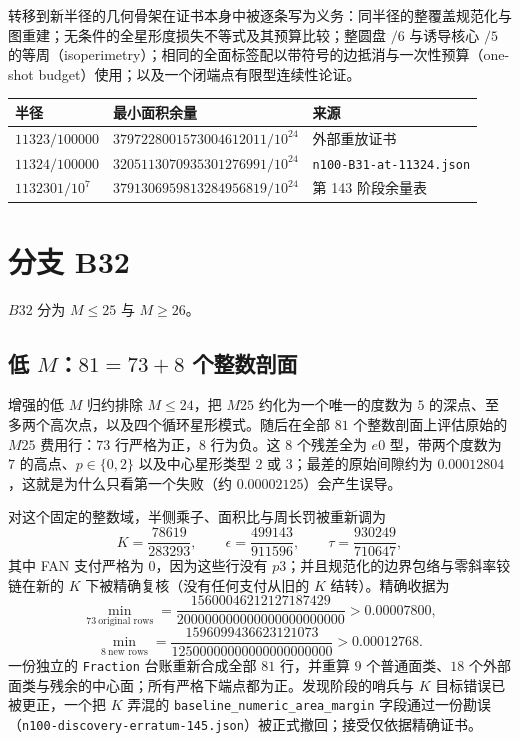 转移到新半径的几何骨架在证书本身中被逐条写为义务：同半径的整覆盖规范化与图重建；无条件的全星形度损失不等式及其预算比较；整圆盘 $/6$ 与诱导核心 $/5$ 的等周（isoperimetry）；相同的全面标签配以带符号的边抵消与一次性预算（one-shot budget）使用；以及一个闭端点有限型连续性论证。

\begin{center}
\footnotesize
\begin{tabular}{@{}>{\raggedright\arraybackslash}p{}>{\raggedright\arraybackslash}p{}>{\raggedright\arraybackslash}p{}@{}}
\toprule
半径 & 最小面积余量 & 来源 \\
\midrule
$11323/100000$ & $3797228001573004612011/10^{24}$ & 外部重放证书 \\
$11324/100000$ & $3205113070935301276991/10^{24}$ & \texttt{n100-\allowbreak{}B31-\allowbreak{}at-\allowbreak{}11324.json} \\
$1132301/10^{7}$ & $3791306959813284956819/10^{24}$ & 第 143 阶段余量表 \\
\bottomrule
\end{tabular}
\end{center}

\section{分支 B32}

$B32$ 分为 $M\le25$ 与 $M\ge26$。

\subsection{低 $M$：$81=73+8$ 个整数剖面}

增强的低 $M$ 归约排除 $M\le24$，把 $M25$ 约化为一个唯一的度数为 $5$ 的深点、至多两个高次点，以及四个循环星形模式。随后在全部 $81$ 个整数剖面上评估原始的 $M25$ 费用行：$73$ 行严格为正，$8$ 行为负。这 $8$ 个残差全为 $e0$ 型，带两个度数为 $7$ 的高点、$p\in\{0,2\}$ 以及中心星形类型 $2$ 或 $3$；最差的原始间隙约为 $0.00012804$，这就是为什么只看第一个失败（约 $0.00002125$）会产生误导。

对这个固定的整数域，半侧乘子、面积比与周长罚被重新调为
\[
K=\frac{78619}{283293},\qquad \epsilon=\frac{499143}{911596},\qquad
\tau=\frac{930249}{710647},
\]
其中 FAN 支付严格为 $0$，因为这些行没有 $p3$；并且规范化的边界包络与零斜率铰链在新的 $K$ 下被精确复核（没有任何支付从旧的 $K$ 结转）。精确收据为
\[
\min_{73\ \text{original rows}}=\frac{15600046212127187429}{200000000000000000000000}>0.00007800,
\]
\[
\min_{8\ \text{new rows}}=\frac{1596099436623121073}{12500000000000000000000}>0.00012768 .
\]
一份独立的 \texttt{Fraction} 台账重新合成全部 $81$ 行，并重算 $9$ 个普通面类、$18$ 个外部面类与残余的中心面；所有严格下端点都为正。发现阶段的哨兵与 $K$ 目标错误已被更正，一个把 $K$ 弄混的 \texttt{baseline\_\allowbreak{}numeric\_\allowbreak{}area\_\allowbreak{}margin} 字段通过一份勘误（\texttt{n100-\allowbreak{}discovery-\allowbreak{}erratum-\allowbreak{}145.json}）被正式撤回；接受仅依据精确证书。

